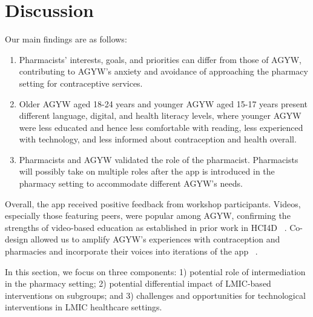 \section{Discussion}

Our main findings are as follows: 
\begin{enumerate}
\item Pharmacists’ interests, goals, and priorities can differ from those of AGYW, contributing to AGYW’s anxiety and avoidance of approaching the pharmacy setting for contraceptive services.
\item Older AGYW aged 18-24 years and younger AGYW aged 15-17 years present different language, digital, and health literacy levels, where younger AGYW were less educated and hence less comfortable with reading, less experienced with technology, and less informed about contraception and health overall. %
\item Pharmacists and AGYW validated the role of the pharmacist. Pharmacists will possibly take on multiple roles after the app is introduced in the pharmacy setting to accommodate different AGYW’s needs.
\end{enumerate}

Overall, the app received positive feedback from workshop participants. Videos, especially those featuring peers, were popular among AGYW, confirming the strengths of video-based education as established in prior work in HCI4D ~\cite{10.1145/2737856.2738023, 4937388, 10.1145/3544548.3581458, 10.1145/3491102.3501950}. Co-design allowed us to amplify AGYW’s experiences with contraception and pharmacies and incorporate their voices into iterations of the app ~\cite{10.1145/3544548.3581458, 10.1145/3613904.3642532, 10.1145/3283458.3283476}.

In this section, we focus on three components: 1) potential role of intermediation in the pharmacy setting; 2) potential differential impact of LMIC-based interventions on subgroups; and 3) challenges and opportunities for technological interventions in LMIC healthcare settings.

